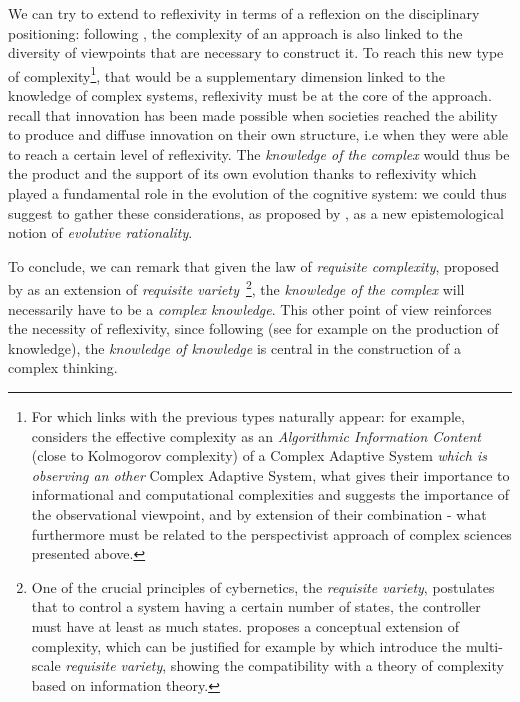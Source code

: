 We can try to extend to reflexivity in terms of a reflexion on the disciplinary positioning: following \cite{pumain2005cumulativite}, the complexity of an approach is also linked to the diversity of viewpoints that are necessary to construct it. To reach this new type of complexity\footnote{For which links with the previous types naturally appear: for example, \cite{gell1995quark} considers the effective complexity as an \emph{Algorithmic Information Content} (close to Kolmogorov complexity) of a Complex Adaptive System \emph{which is observing an other} Complex Adaptive System, what gives their importance to informational and computational complexities and suggests the importance of the observational viewpoint, and by extension of their combination - what furthermore must be related to the perspectivist approach of complex sciences presented above.}, that would be a supplementary dimension linked to the knowledge of complex systems, reflexivity must be at the core of the approach. \cite{read2009innovation} recall that innovation has been made possible when societies reached the ability to produce and diffuse innovation on their own structure, i.e when they were able to reach a certain level of reflexivity. The \emph{knowledge of the complex} would thus be the product and the support of its own evolution thanks to reflexivity which played a fundamental role in the evolution of the cognitive system: we could thus suggest to gather these considerations, as proposed by , as a new epistemological notion of \emph{evolutive rationality}.



To conclude, we can remark that given the law of \emph{requisite complexity}, proposed by \cite{gershenson2015requisite} as an extension of \emph{requisite variety}~\cite{ashby1991requisite}\footnote{One of the crucial principles of cybernetics, the \emph{requisite variety}, postulates that to control a system having a certain number of states, the controller must have at least as much states.  proposes a conceptual extension of complexity, which can be justified for example by \cite{allen2017multiscale} which introduce the multi-scale \emph{requisite variety}, showing the compatibility with a theory of complexity based on information theory.}, the \emph{knowledge of the complex} will necessarily have to be a \emph{complex knowledge}. This other point of view reinforces the necessity of reflexivity, since following  (see for example \cite{morin1991methode} on the production of knowledge), the \emph{knowledge of knowledge} is central in the construction of a complex thinking.



